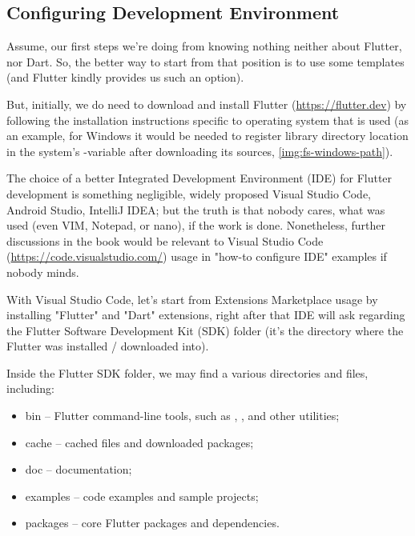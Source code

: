 
\subsection{Configuring Development Environment}

Assume, our first steps we're doing from knowing nothing neither about Flutter, nor Dart. So, the better way to start 
from that position is to use some templates (and Flutter kindly provides us such an option).

But, initially, we do need to download and install Flutter (\href{https://flutter.dev}{https://flutter.dev}) by 
following the installation instructions specific to operating system that is used (as an example, for Windows it 
would be needed to register library directory location in the system's -variable after downloading its sources, 
\cref{img:fs-windows-path}).


The choice of a better Integrated Development Environment (IDE) for Flutter development is something negligible, widely
proposed Visual Studio Code, Android Studio, IntelliJ IDEA; but the truth is that nobody cares, what was used (even VIM,
Notepad, or nano), if the work is done. Nonetheless, further discussions in the book would be relevant to Visual 
Studio Code (\href{https://code.visualstudio.com/}{https://code.visualstudio.com/}) usage in "how-to configure IDE" 
examples if nobody minds.

With Visual Studio Code, let's start from Extensions Marketplace usage by installing "Flutter" and "Dart" extensions, 
right after that IDE will ask regarding the Flutter Software Development Kit (SDK) folder (it's the directory where 
the Flutter was installed / downloaded into).

Inside the Flutter SDK folder, we may find a various directories and files, including:

\begin{itemize}
  \item bin -- Flutter command-line tools, such as , , and other utilities;
  \item cache -- cached files and downloaded packages;
  \item doc -- documentation;
  \item examples -- code examples and sample projects;
  \item packages -- core Flutter packages and dependencies.
\end{itemize}

